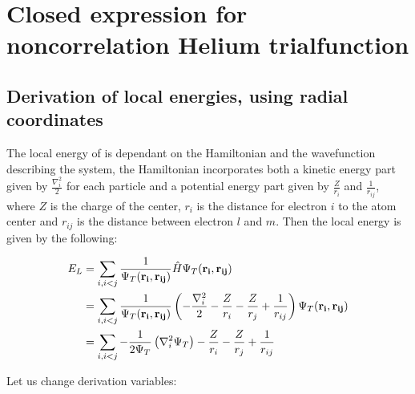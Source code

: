 
\chapter{Closed expression for noncorrelation Helium trialfunction}
	\label{sec:helium_noncorrelating}
	\section{Derivation of local energies, using radial coordinates}
		The local energy of is dependant on the Hamiltonian and the wavefunction describing the system, the Hamiltonian incorporates both a kinetic energy part given by \( \frac{\nabla_i^2}{2} \) for each particle
		and a potential energy part given by \(\frac{Z}{r_i}\) and \(\frac{1}{r_{ij}}\), where \(Z\) is the charge of the center, \(r_i\) is the distance for electron \(i\) to the atom center and \(r_{ij}\) is the distance between electron \(l\) and \(m\). Then the local energy is given by the following:

		\begin{align}
			E_L &= \sum_{i,i<j}{\frac{1}{ \Psi_T(\vb{r_i} , \vb{r_{ij}}) } \hat{H} \Psi_T(\vb{r_i} , \vb{r_{ij}})}
			\\
			&=	\sum_{i,i<j}\frac{1}{ \Psi_T(\vb{r_i} , \vb{r_{ij}}) } \left( - \frac{\nabla_i^2}{2} -\frac{Z}{r_i}  -  \frac{Z}{r_j} +  \frac{1}{r_{ij} }  \right) \Psi_T(\vb{r_i} , \vb{r_{ij}})
			\\
			&= \sum_{i,i<j}{-\frac{1}{2\Psi_T} \left(\nabla_i^2 \Psi_T  \right)  -\frac{Z}{r_i}  -  \frac{Z}{r_j} +  \frac{1}{r_{ij} }}
		\end{align}

		Let us change derivation variables:

